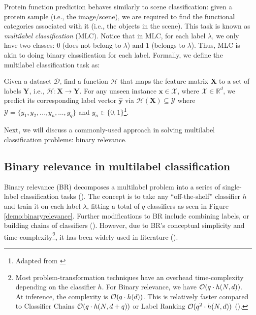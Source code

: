 \newpage
\par Protein function prediction behaves similarly to scene classification:
given a protein sample (i.e., the image/scene), we are required to find the
functional categories associated with it (i.e., the objects in the scene).
This task is known as \textit{multilabel classification} (MLC). Notice that
in MLC, for each label $\lambda$, we only have two classes: $0$ (does not
belong to $\lambda$) and $1$ (belongs to $\lambda$). Thus, MLC is akin to
doing binary classification for each label. Formally, we define the multilabel
classification task as:

\begin{definition}{}
Given a dataset $\mathcal{D}$, find a function $\mathcal{H}$ that maps the
feature matrix $\mathbf{X}$ to a set of labels $\mathbf{Y}$, i.e.,
$\mathcal{H}: \mathbf{X} \rightarrow \mathbf{Y}$. For any unseen instance
$\mathbf{x} \in \mathcal{X}$, where $\mathcal{X} \in \mathbb{R}^d$, we
predict its corresponding label vector $\mathbf{\widehat{y}}$ via
$\mathcal{H}(\mathbf{X}) \subseteq \mathcal{Y}$ where $\mathcal{Y} = \{y_1,
y_2, \dots, y_n, \dots, y_q\}$ and $y_n \in \{0,1\}$\footnote{Adapted from
\cite{zhang2014review}}.
\end{definition}

\par Next, we will discuss a commonly-used approach in solving multilabel
classification problems: binary relevance.

\subsection{Binary relevance in multilabel classification}

\par Binary relevance (BR) decomposes a multilabel problem into a series of
single-label classification tasks (\cite{godbole2004discriminative,
tsoumakas2007multilabel}). The concept is to take any ``off-the-shelf''
classifier $h$ and train it on each label $\lambda$, fitting a total of $q$
classifiers as seen in Figure \ref{demo:binaryrelevance}. Further
modifications to BR include combining labels, or building chains of
classifiers (\cite{read2009classifier}). However, due to BR's conceptual
simplicity and time-complexity\footnote[2]{
    Most problem-transformation techniques have an overhead time-complexity
    depending on the classifier $h$. For Binary relevance, we have $\mathcal{O}(q
    \cdot h(N, d))$. At inference, the complexity is $\mathcal{O}(q
    \cdot h(d))$. This is relatively faster compared to Classifier Chains
    $\mathcal{O}(q \cdot h(N, d + q))$ or Label Ranking $\mathcal{O}(q^{2} \cdot h(N, d))$
    (\cite{zhang2014review}).
}, it has been widely used in literature (\cite{zhang2017binary}).

